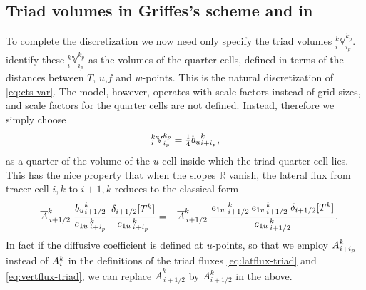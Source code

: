 \documentclass[../tex_main/NEMO_manual]{subfiles}
\begin{document}
\subsection{Triad volumes in Griffes's scheme and in \NEMO}
To complete the discretization we now need only specify the triad
volumes $_i^k\mathbb{V}_{i_p}^{k_p}$. \citet{Griffies_al_JPO98} identify
these $_i^k\mathbb{V}_{i_p}^{k_p}$ as the volumes of the quarter
cells, defined in terms of the distances between $T$, $u$,$f$ and
$w$-points. This is the natural discretization of
\autoref{eq:cts-var}. The \NEMO model, however, operates with scale
factors instead of grid sizes, and scale factors for the quarter
cells are not defined. Instead, therefore we simply choose
\begin{equation}
  \label{eq:V-NEMO}
  _i^k\mathbb{V}_{i_p}^{k_p}=\textstyle\frac{1}{4} {b_u}_{i+i_p}^k,
\end{equation}
as a quarter of the volume of the $u$-cell inside which the triad
quarter-cell lies. This has the nice property that when the slopes
$\mathbb{R}$ vanish, the lateral flux from tracer cell $i,k$ to
$i+1,k$ reduces to the classical form
\begin{equation}
  \label{eq:lat-normal}
-\overline{{A}}_{\,i+1/2}^k\;
\frac{{b_u}_{i+1/2}^k}{{e_{1u}}_{\,i + i_p}^{\,k}}
\;\frac{\delta_{i+ 1/2}[T^k] }{{e_{1u}}_{\,i + i_p}^{\,k}}
 = -\overline{{A}}_{\,i+1/2}^k\;\frac{{e_{1w}}_{\,i + 1/2}^{\,k}\:{e_{1v}}_{\,i + 1/2}^{\,k}\;\delta_{i+ 1/2}[T^k]}{{e_{1u}}_{\,i + 1/2}^{\,k}}.
\end{equation}
In fact if the diffusive coefficient is defined at $u$-points, so that
we employ ${A}_{i+i_p}^k$ instead of  ${A}_i^k$ in the definitions of the
triad fluxes \autoref{eq:latflux-triad} and \autoref{eq:vertflux-triad},
we can replace $\overline{A}_{\,i+1/2}^k$ by $A_{i+1/2}^k$ in the above.
\end{document}
